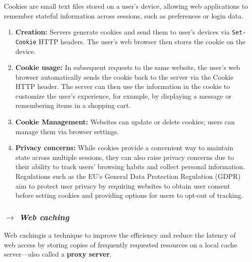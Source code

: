 Cookies are small text files stored on a user's device, allowing web applications to remember stateful information across sessions, such as preferences or login data.

\begin{enumerate}
    \item \textbf{Creation:} Servers generate cookies and send them to user's devices via \texttt{Set-Cookie} HTTP headers. The user's web browser then stores the cookie on the device.
    \item \textbf{Cookie usage:} In subsequent requests to the same website, the user's web browser automatically sends the cookie back to the server via the Cookie HTTP header. The server can then use the information in the cookie to customize the user's experience, for example, by displaying a message or remembering items in a shopping cart.
    \item \textbf{Cookie Management:} Websites can update or delete cookies; users can manage them via browser settings.
    \item \textbf{Privacy concerns:} While cookies provide a convenient way to maintain state across multiple sessions, they can also raise privacy concerns due to their ability to track users' browsing habits and collect personal information. Regulations such as the EU's General Data Protection Regulation (GDPR) aim to protect user privacy by requiring websites to obtain user consent before setting cookies and providing options for users to opt-out of tracking.
\end{enumerate}

\subsubsection[2.2.7 Web caching]{$\pmb{\rightarrow}$ \textit{Web caching}}

Web cachingis a technique to improve the efficiency and reduce the latency of web access by storing copies of frequently requested resources on a local cache server---also called a \textbf{proxy server}.

